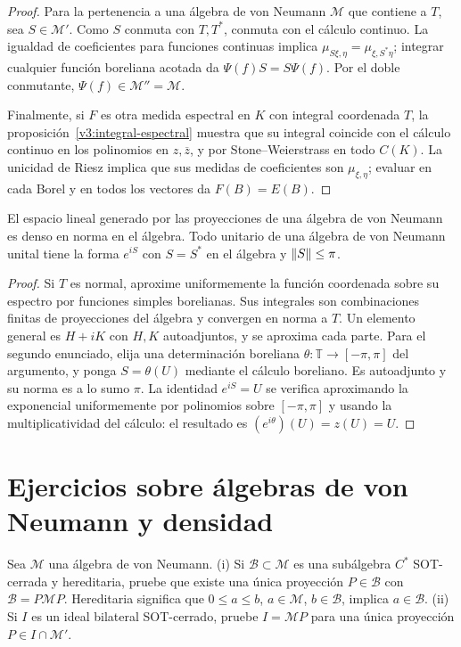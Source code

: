 \begin{proof}
Para la pertenencia a una álgebra de von Neumann $\mathcal M$ que contiene a $T$, sea $S\in\mathcal M'$. Como $S$ conmuta con $T,T^*$, conmuta con el cálculo continuo. La igualdad de coeficientes para funciones continuas implica $\mu_{S\xi,\eta}=\mu_{\xi,S^*\eta}$; integrar cualquier función boreliana acotada da $\Psi(f)S=S\Psi(f)$. Por el doble conmutante, $\Psi(f)\in\mathcal M''=\mathcal M$.

Finalmente, si $F$ es otra medida espectral en $K$ con integral coordenada $T$, la proposición~\ref{v3:integral-espectral} muestra que su integral coincide con el cálculo continuo en los polinomios en $z,\overline z$, y por Stone--Weierstrass en todo $C(K)$. La unicidad de Riesz implica que sus medidas de coeficientes son $\mu_{\xi,\eta}$; evaluar en cada Borel y en todos los vectores da $F(B)=E(B)$.
\end{proof}

\begin{corolario}\label{v3:proyecciones-generan}
El espacio lineal generado por las proyecciones de una álgebra de von Neumann es denso en norma en el álgebra. Todo unitario de una álgebra de von Neumann unital tiene la forma $e^{iS}$ con $S=S^*$ en el álgebra y $\left\lVert S\right\rVert\le\pi$.
\end{corolario}
\begin{proof}
Si $T$ es normal, aproxime uniformemente la función coordenada sobre su espectro por funciones simples borelianas. Sus integrales son combinaciones finitas de proyecciones del álgebra y convergen en norma a $T$. Un elemento general es $H+iK$ con $H,K$ autoadjuntos, y se aproxima cada parte. Para el segundo enunciado, elija una determinación boreliana $\theta:\mathbb T\to[-\pi,\pi]$ del argumento, y ponga $S=\theta(U)$ mediante el cálculo boreliano. Es autoadjunto y su norma es a lo sumo $\pi$. La identidad $e^{iS}=U$ se verifica aproximando la exponencial uniformemente por polinomios sobre $[-\pi,\pi]$ y usando la multiplicatividad del cálculo: el resultado es $(e^{i\theta})(U)=z(U)=U$.
\end{proof}

\section{Ejercicios sobre álgebras de von Neumann y densidad}

\begin{ejercicio}\label{ej:v3-l33-1}
Sea $\mathcal M$ una álgebra de von Neumann. (i) Si $\mathcal B\subset\mathcal M$ es una subálgebra $C^*$ SOT-cerrada y hereditaria, pruebe que existe una única proyección $P\in\mathcal B$ con $\mathcal B=P\mathcal M P$. Hereditaria significa que $0\le a\le b$, $a\in\mathcal M$, $b\in\mathcal B$, implica $a\in\mathcal B$. (ii) Si $I$ es un ideal bilateral SOT-cerrado, pruebe $I=\mathcal M P$ para una única proyección $P\in I\cap\mathcal M'$.
\end{ejercicio}


